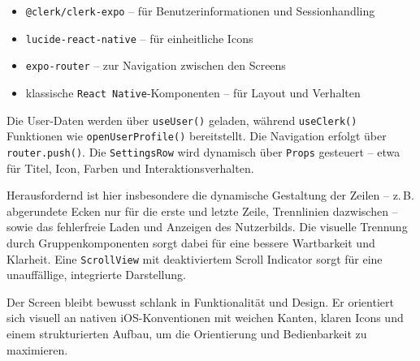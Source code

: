 \begin{itemize}
    \item \texttt{@clerk/clerk-expo} – für Benutzerinformationen und Sessionhandling
    \item \texttt{lucide-react-native} – für einheitliche Icons
    \item \texttt{expo-router} – zur Navigation zwischen den Screens
    \item klassische \texttt{React Native}-Komponenten – für Layout und Verhalten
\end{itemize}

Die User-Daten werden über \texttt{useUser()} geladen, während \texttt{useClerk()} Funktionen wie \texttt{openUserProfile()} bereitstellt. Die Navigation erfolgt über \texttt{router.push()}. Die \texttt{SettingsRow} wird dynamisch über \texttt{Props} gesteuert – etwa für Titel, Icon, Farben und Interaktionsverhalten.

Herausfordernd ist hier insbesondere die dynamische Gestaltung der Zeilen – z.\,B. abgerundete Ecken nur für die erste und letzte Zeile, Trennlinien dazwischen – sowie das fehlerfreie Laden und Anzeigen des Nutzerbilds. Die visuelle Trennung durch Gruppenkomponenten sorgt dabei für eine bessere Wartbarkeit und Klarheit. Eine \texttt{ScrollView} mit deaktiviertem Scroll Indicator sorgt für eine unauffällige, integrierte Darstellung.

Der Screen bleibt bewusst schlank in Funktionalität und Design. Er orientiert sich visuell an nativen iOS-Konventionen mit weichen Kanten, klaren Icons und einem strukturierten Aufbau, um die Orientierung und Bedienbarkeit zu maximieren.
